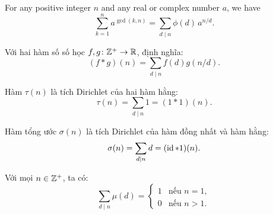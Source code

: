 \documentclass[../imo-training-open-book.tex]{subfiles}
\begin{document}
\vspace{1em}

\begin{theorem}
    \label{theorem:gcd-power-sum}
    For any positive integer \( n \) and any real or complex number \( a \), we have
    \[
        \sum_{k=1}^n a^{\gcd(k,n)} = \sum_{d \mid n} \phi(d) \, a^{n/d}.
    \]
\end{theorem}

\vspace{1em}

\begin{definition}
    \label{definition:dirichlet-convolution}
    Với hai hàm số số học \( f, g \colon \mathbb Z^+ \to \mathbb R \), định nghĩa:
    \[
        (f * g)(n) = \sum_{d \mid n} f(d) g(n/d).
    \]
\end{definition}

\vspace{1em}

\begin{theorem}[\href{https://w.wiki/9WO3}{Đẳng thức \( \tau = 1 * 1 \)}]
    \label{theorem:tau-convolution}
    Hàm \( \tau(n) \) là tích Dirichlet của hai hàm hằng:
    \[
        \tau(n) = \sum_{d \mid n} 1 = (1 * 1)(n).
    \]
\end{theorem}

\vspace{1em}

\begin{theorem}[\href{https://w.wiki/9WO4}{Đẳng thức \( \sigma = \id * 1 \)}]
    \label{theorem:sigma-convolution}
    Hàm tổng ước \( \sigma(n) \) là tích Dirichlet của hàm đồng nhất và hàm hằng:
    \[
        \sigma(n) = \sum_{d \mid n} d = (\operatorname{id} * 1)(n).
    \]
\end{theorem}

\vspace{1em}

\begin{theorem}
    \label{theorem:sum-mu-divisors}
    Với mọi \( n \in \mathbb Z^+ \), ta có:
    \[
        \sum_{d \mid n} \mu(d) =
        \begin{cases}
            1 & \text{nếu } n = 1, \\
            0 & \text{nếu } n > 1.
        \end{cases}
    \]
\end{theorem}

\vspace{1em}
\end{document}
